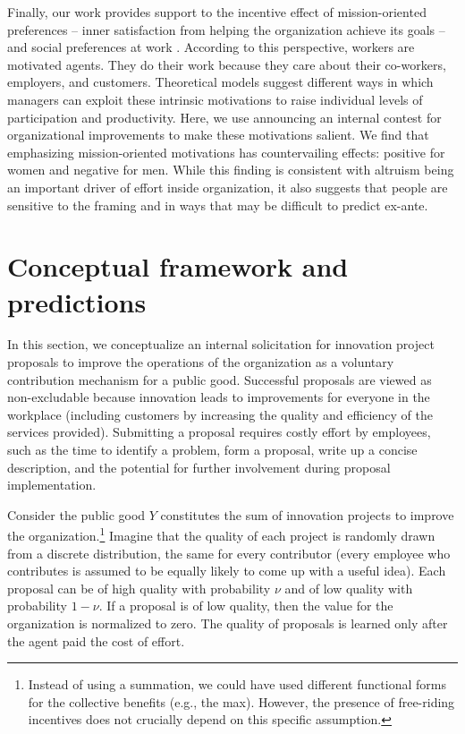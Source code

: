 \documentclass[11pt, titlepage]{article}
\begin{document}
Finally, our work provides support to the incentive effect of
mission-oriented preferences -- inner satisfaction from helping the
organization achieve its goals --
\citep{akerlof2005identity, besley2005competition, delfgaauw2005dedicated, delfgaauw2008incentives, prendergast2007motivation, rotemberg2006altruism}
and social preferences at work
\citep{bandiera2005social, bandiera2008social, bandiera2013team, dellavigna2016estimating}.
According to this perspective, workers are motivated agents. They do
their work because they care about their co-workers, employers, and
customers. Theoretical models suggest different ways in which managers
can exploit these intrinsic motivations to raise individual levels of
participation and productivity. Here, we use announcing an internal
contest for organizational improvements to make these motivations
salient. We find that emphasizing mission-oriented motivations has
countervailing effects: positive for women and negative for men. While
this finding is consistent with altruism being an important driver of
effort inside organization, it also suggests that people are sensitive
to the framing and in ways that may be difficult to predict ex-ante.

\section{Conceptual framework and
predictions}\label{conceptual-framework-and-predictions}

In this section, we conceptualize an internal solicitation for
innovation project proposals to improve the operations of the
organization as a voluntary contribution mechanism for a public good.
Successful proposals are viewed as non-excludable because innovation
leads to improvements for everyone in the workplace (including customers
by increasing the quality and efficiency of the services provided).
Submitting a proposal requires costly effort by employees, such as the
time to identify a problem, form a proposal, write up a concise
description, and the potential for further involvement during proposal
implementation.

Consider the public good \(Y\) constitutes the sum of innovation
projects to improve the organization.\footnote{Instead of using a
  summation, we could have used different functional forms for the
  collective benefits (e.g., the max). However, the presence of
  free-riding incentives does not crucially depend on this specific
  assumption.} Imagine that the quality of each project is randomly
drawn from a discrete distribution, the same for every contributor
(every employee who contributes is assumed to be equally likely to come
up with a useful idea). Each proposal can be of high quality with
probability \(\nu\) and of low quality with probability \(1-\nu\). If a
proposal is of low quality, then the value for the organization is
normalized to zero. The quality of proposals is learned only after the
agent paid the cost of effort.
\end{document}
